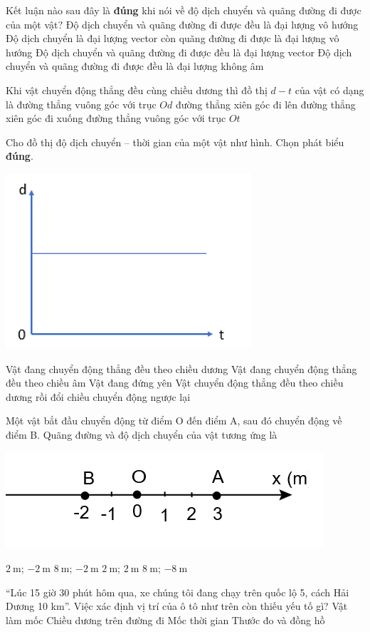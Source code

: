 \begin{ex}
Kết luận nào sau đây là \textbf{đúng} khi nói về độ dịch chuyển và quãng đường đi được của một vật?	
	\choice
	{Độ dịch chuyển và quãng đường đi được đều là đại lượng vô hướng}
	{\True Độ dịch chuyển là đại lượng vector còn quãng đường đi được là đại lượng vô hướng}
	{Độ dịch chuyển và quãng đường đi được đều là đại lượng vector}
	{Độ dịch chuyển và quãng đường đi được đều là đại lượng không âm}
	\loigiai{}
\end{ex}
\begin{ex}
	Khi vật chuyển động thẳng đều cùng chiều dương thì đồ thị $d - t$ của vật có dạng là
	\choice
	{đường thẳng vuông góc với trục $Od$}
	{\True đường thẳng xiên góc đi lên}
	{đường thẳng xiên góc đi xuống}
	{đường thẳng vuông góc với trục $Ot$}
	\loigiai{}
\end{ex}
\begin{ex}
	Cho đồ thị độ dịch chuyển – thời gian của một vật như hình. Chọn phát biểu \textbf{đúng}.	
	\begin{center}
		\includegraphics[width=0.25\linewidth]{figs/VN10-2023-PH-TP005-P-1}
	\end{center}
	\choice
	{Vật đang chuyển động thẳng đều theo chiều dương}
	{Vật đang chuyển động thẳng đều theo chiều âm}
	{\True Vật đang đứng yên}
	{Vật chuyển động thẳng đều theo chiều dương rồi đổi chiều chuyển động ngược lại}
	\loigiai{}
\end{ex}

\begin{ex}
Một vật bắt đầu chuyển động từ điểm O đến điểm A, sau đó chuyển động về điểm B. Quãng đường và độ dịch chuyển của vật tương ứng là	
\begin{center}
	\includegraphics[width=0.4\linewidth]{figs/VN10-2022-PH-TP004-P-2}
\end{center}
	\choice
	{$\SI{2}{\meter}$; $\SI{-2}{\meter}$}
	{\True $\SI{8}{\meter}$; $\SI{-2}{\meter}$}
	{$\SI{2}{\meter}$; $\SI{2}{\meter}$}
	{$\SI{8}{\meter}$; $\SI{-8}{\meter}$}
	\loigiai{}
\end{ex}
\begin{ex}
“Lúc 15 giờ 30 phút hôm qua, xe chúng tôi đang chạy trên quốc lộ 5, cách Hải Dương 10 km”. Việc xác định vị trí của ô tô như trên còn thiếu yếu tố gì?	
	\choice
	{Vật làm mốc}
	{\True Chiều dương trên đường đi}
	{Mốc thời gian}
	{Thước đo và đồng hồ}
	\loigiai{}
\end{ex}

